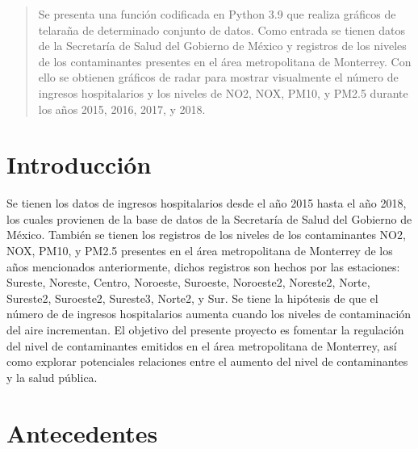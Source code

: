 \documentclass[a0]{sciposter} %
\begin{document}
\begin{multicols}{2} 

\begin{abstract}
Se presenta una función codificada en Python 3.9 \citep{python} que realiza gráficos de telaraña de determinado conjunto de datos. Como entrada se tienen datos de la Secretaría de Salud del Gobierno de México y registros de los niveles de los contaminantes presentes en el área metropolitana de Monterrey. Con ello se obtienen gráficos de radar para mostrar visualmente el número de ingresos hospitalarios y los niveles de NO2, NOX, PM10, y PM2.5 durante los años 2015, 2016, 2017, y 2018.
\end{abstract}

\section{Introducción}

Se tienen los datos de ingresos hospitalarios desde el año 2015 hasta el año 2018, los cuales provienen de la base de datos de la Secretaría de Salud del Gobierno de México. También se tienen los registros de los niveles de los contaminantes NO2, NOX, PM10, y PM2.5 presentes en el área metropolitana de Monterrey de los años mencionados anteriormente, dichos registros son hechos por las estaciones: Sureste, Noreste, Centro, Noroeste, Suroeste, Noroeste2, Noreste2, Norte, Sureste2, Suroeste2, Sureste3, Norte2, y Sur.
Se tiene la hipótesis de que el número de de ingresos hospitalarios aumenta cuando los niveles de contaminación del aire incrementan. 
El objetivo del presente proyecto es fomentar la regulación del nivel de contaminantes emitidos en el área metropolitana de Monterrey, así como explorar potenciales relaciones entre el aumento del nivel de contaminantes y la salud pública.

\section{Antecedentes}


\end{multicols}
\end{document}
